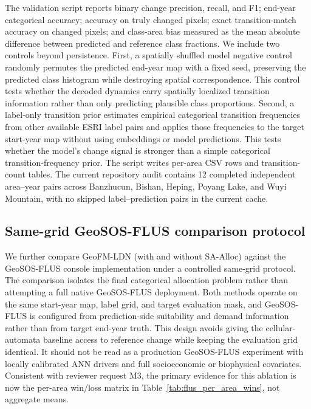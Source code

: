 \documentclass{article}
\begin{document}
The validation script reports binary change precision, recall, and F1; end-year categorical accuracy; accuracy on truly changed pixels; exact transition-match accuracy on changed pixels; and class-area bias measured as the mean absolute difference between predicted and reference class fractions. We include two controls beyond persistence. First, a spatially shuffled model negative control randomly permutes the predicted end-year map with a fixed seed, preserving the predicted class histogram while destroying spatial correspondence. This control tests whether the decoded dynamics carry spatially localized transition information rather than only predicting plausible class proportions. Second, a label-only transition prior estimates empirical categorical transition frequencies from other available ESRI label pairs and applies those frequencies to the target start-year map without using embeddings or model predictions. This tests whether the model's change signal is stronger than a simple categorical transition-frequency prior. The script writes per-area CSV rows and transition-count tables. The current repository audit contains 12 completed independent area--year pairs across Banzhucun, Bishan, Heping, Poyang Lake, and Wuyi Mountain, with no skipped label--prediction pairs in the current cache.

\subsection{Same-grid GeoSOS-FLUS comparison protocol}
\label{sec:geosos_flus_protocol}

We further compare GeoFM-LDN (with and without SA-Alloc) against the GeoSOS-FLUS console implementation under a controlled same-grid protocol. The comparison isolates the final categorical allocation problem rather than attempting a full native GeoSOS-FLUS deployment. Both methods operate on the same start-year map, label grid, and target evaluation mask, and GeoSOS-FLUS is configured from prediction-side suitability and demand information rather than from target end-year truth. This design avoids giving the cellular-automata baseline access to reference change while keeping the evaluation grid identical. It should not be read as a production GeoSOS-FLUS experiment with locally calibrated ANN drivers and full socioeconomic or biophysical covariates. Consistent with reviewer request M3, the primary evidence for this ablation is now the per-area win/loss matrix in Table~\ref{tab:flus_per_area_wins}, not aggregate means.
\end{document}
